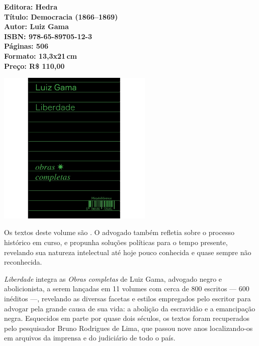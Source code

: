 \vfill
\noindent\begin{minipage}[c]{1\linewidth}
{\small\textbf{
\hspace*{-.1cm}Editora: Hedra\\
Título: Democracia (1866--1869)\\
Autor: Luiz Gama\\ 
ISBN: 978-65-89705-12-3\\
Páginas: 506\\
Formato: 13,3x21\,cm\\
Preço: R\$ 110,00\\
}}
\end{minipage}
\pagebreak

\begin{center}
\hspace*{.5cm}\includegraphics[width=74mm]{./CAPAS/HEDRA_LIBERDADE.jpg}
\end{center}
\hspace*{-7cm}\hrulefill\hspace*{-7cm}
\medskip

\noindent{}Os textos deste volume são . O advogado também refletia sobre o processo histórico em curso, e propunha soluções políticas para o tempo presente, revelando sua natureza intelectual até hoje pouco conhecida e quase sempre não reconhecida.

\textit{Liberdade} integra as \textit{Obras completas} de Luiz Gama, advogado negro e abolicionista, a serem lançadas em 11 volumes com cerca de 800 escritos --- 600 inéditos ---, revelando as diversas facetas e estilos empregados pelo escritor para advogar pela grande causa de sua vida: a abolição da escravidão e a emancipação negra. Esquecidos em parte por quase dois séculos, os textos foram recuperados pelo pesquisador Bruno Rodrigues de Lima, que passou nove anos localizando-os em arquivos da imprensa e do judiciário de todo o país.

